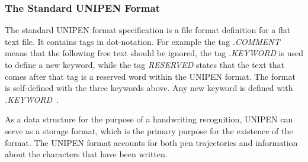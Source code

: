 \subsubsection{The Standard UNIPEN Format}
\label{sec:hwre:standardunipenformat}

The standard UNIPEN format specification is a file format definition for a flat
text file. It contains tags in dot-notation. For example the tag \emph{.COMMENT}
means that the following free text should be ignored, the tag \emph{.KEYWORD} 
is used to define a new keyword, while the tag \emph{RESERVED} states that
the text that comes after that tag is a reserved word within the UNIPEN format.
The format is self-defined with the three keywords above. Any new keyword is
defined with \emph{.KEYWORD}~.

As a data structure for the purpose of a handwriting recognition, UNIPEN can 
serve as a storage format, which is the primary purpose for the existence of the
format. The UNIPEN format accounts for both pen trajectories and 
information about the characters that have been written.

